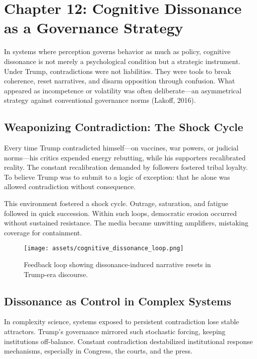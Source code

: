 \documentclass[
]{article}
\author{}
\date{}
\begin{document}
\chapter{Chapter 12: Cognitive Dissonance as a Governance Strategy}

In systems where perception governs behavior as much as policy, cognitive dissonance is not merely a psychological condition but a strategic instrument. Under Trump, contradictions were not liabilities. They were tools to break coherence, reset narratives, and disarm opposition through confusion. What appeared as incompetence or volatility was often deliberate---an asymmetrical strategy against conventional governance norms (Lakoff, 2016).

\section*{Weaponizing Contradiction: The Shock Cycle}

Every time Trump contradicted himself---on vaccines, war powers, or judicial norms---his critics expended energy rebutting, while his supporters recalibrated reality. The constant recalibration demanded by followers fostered tribal loyalty. To believe Trump was to submit to a logic of exception: that he alone was allowed contradiction without consequence.

This environment fostered a shock cycle. Outrage, saturation, and fatigue followed in quick succession. Within such loops, democratic erosion occurred without sustained resistance. The media became unwitting amplifiers, mistaking coverage for containment.

\begin{figure}[H]
\centering
\texttt{[image: assets/cognitive\_dissonance\_loop.png]}
\caption{Feedback loop showing dissonance-induced narrative resets in Trump-era discourse.}
\label{fig:cognitive_dissonance_loop}
\end{figure}

\section*{Dissonance as Control in Complex Systems}

In complexity science, systems exposed to persistent contradiction lose stable attractors. Trump's governance mirrored such stochastic forcing, keeping institutions off-balance. Constant contradiction destabilized institutional response mechanisms, especially in Congress, the courts, and the press.
\end{document}
